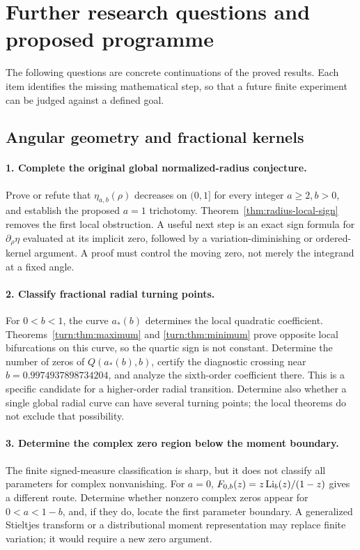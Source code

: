 \section{Further research questions and proposed programme}
\label{sec:agenda}

The following questions are concrete continuations of the proved
results. Each item identifies the missing mathematical step, so that a
future finite experiment can be judged against a defined goal.

\subsection{Angular geometry and fractional kernels}

\paragraph{1. Complete the original global normalized-radius conjecture.}
Prove or refute that $\eta_{a,b}(\rho)$ decreases on $(0,1]$ for
every integer $a\ge2,b>0$, and establish the proposed $a=1$
trichotomy. Theorem~\ref{thm:radius-local-sign} removes the first local
obstruction. A useful next step is an exact sign formula for
$\partial_\rho\eta$ evaluated at its implicit zero, followed by a
variation-diminishing or ordered-kernel argument. A proof must control
the moving zero, not merely the integrand at a fixed angle.

\paragraph{2. Classify fractional radial turning points.}
For $0<b<1$, the curve $a_*(b)$ determines the local quadratic
coefficient. Theorems~\ref{turn:thm:maximum} and \ref{turn:thm:minimum}
prove opposite local bifurcations on this curve, so the quartic sign
is not constant. Determine the number of zeros of
$Q(a_*(b),b)$, certify the diagnostic crossing near
$b=0.9974937898734204$, and analyze the sixth-order coefficient there.
This is a specific candidate for a higher-order radial transition.
Determine also whether a single global radial curve can have several
turning points; the local theorems do not exclude that possibility.

\paragraph{3. Determine the complex zero region below the moment boundary.}
The finite signed-measure classification is sharp, but it does not
classify all parameters for complex nonvanishing. For $a=0$,
$F_{0,b}(z)=z\operatorname{Li}_b(z)/(1-z)$ gives a different route. Determine
whether nonzero complex zeros appear for $0<a<1-b$, and, if they do,
locate the first parameter boundary. A generalized Stieltjes transform
or a distributional moment representation may replace finite variation;
it would require a new zero argument.

